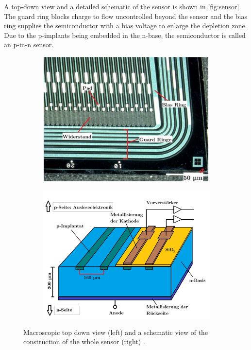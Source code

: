 A top-down view and a detailed schematic of the sensor is shown in \autoref{fig:sensor}. The guard ring blocks charge to flow uncontrolled beyond the sensor
and the bias ring supplies the semiconductor with a bias voltage to enlarge the depletion zone. Due to the p-implants
being embedded in the n-base, the semiconductor is called an p-in-n sensor.
\begin{figure}
    \centering
    \begin{subfigure}{0.45\textwidth}
      \includegraphics[width = \textwidth]{content/pics/Silicon_Sensor_TOPDOWN.png}
    \end{subfigure}
    \hfill
    \begin{subfigure}{0.45\textwidth}
      \includegraphics[width = \textwidth]{content/pics/Silicon_Sensor_SCHEMATIC.png}
    \end{subfigure}    
    \caption{Macroscopic top down view (left) and a schematic view of the construction of the whole sensor (right) \cite{SiliconStrip}.}
    \label{fig:sensor}
  \end{figure}\\
